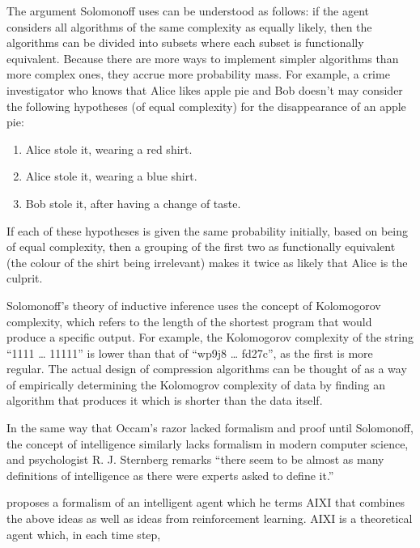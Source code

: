 The argument Solomonoff uses can be understood as follows: if the agent considers all algorithms of the same complexity as equally likely, then the algorithms can be divided into subsets where each subset is functionally equivalent. Because there are more ways to implement simpler algorithms than more complex ones, they accrue more probability mass. For example, a crime investigator who knows that Alice likes apple pie and Bob doesn’t may consider the following hypotheses (of equal complexity) for the disappearance of an apple pie:

\begin{enumerate}
    \item Alice stole it, wearing a red shirt.
    \item Alice stole it, wearing a blue shirt.
    \item Bob stole it, after having a change of taste.
\end{enumerate}

If each of these hypotheses is given the same probability initially, based on being of equal complexity, then a grouping of the first two as functionally equivalent (the colour of the shirt being irrelevant) makes it twice as likely that Alice is the culprit.

Solomonoff’s theory of inductive inference uses the concept of Kolomogorov complexity, which refers to the length of the shortest program that would produce a specific output. For example, the Kolomogorov complexity of the string “1111 … 11111” is lower than that of “wp9j8 … fd27c”, as the first is more regular. The actual design of compression algorithms can be thought of as a way of empirically determining the Kolomogrov complexity of data by finding an algorithm that produces it which is shorter than the data itself.

In the same way that Occam’s razor lacked formalism and proof until Solomonoff, the concept of intelligence similarly lacks formalism in modern computer science, and psychologist R. J. Sternberg remarks “there seem to be almost as many definitions of intelligence as there were experts asked to define it.” \autocite{Legg2007}

\textcite{Hutter2000} proposes a formalism of an intelligent agent which he terms AIXI that combines the above ideas as well as ideas from reinforcement learning. AIXI is a theoretical agent which, in each time step,

